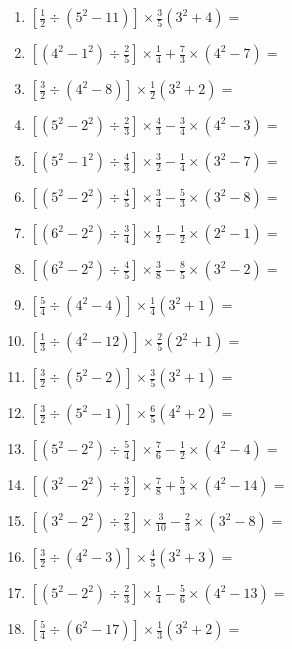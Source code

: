 \documentclass[12pt]{article}
\begin{document}
\begin{enumerate}[ itemsep=1.5cm]
	\item $\displaystyle \left[ \frac{1}{2} \div \left( 5^2 - 11 \right) \right] \times \frac{3}{5} \left( 3^2 + 4 \right) =$
	\item $\displaystyle \left[ \left( 4^2 - 1^2 \right) \div \frac{2}{5} \right] \times \frac{1}{4} + \frac{7}{3} \times \left( 4^2 - 7 \right) =$
	\item $\displaystyle \left[ \frac{3}{2} \div \left( 4^2 - 8 \right) \right] \times \frac{1}{2} \left( 3^2 + 2 \right) =$
	\item $\displaystyle \left[ \left( 5^2 - 2^2 \right) \div \frac{2}{3} \right] \times \frac{4}{3} - \frac{3}{4} \times \left( 4^2 - 3 \right) =$
	\item $\displaystyle \left[ \left( 5^2 - 1^2 \right) \div \frac{4}{3} \right] \times \frac{3}{2} - \frac{1}{4} \times \left( 3^2 - 7 \right) =$
	\item $\displaystyle \left[ \left( 5^2 - 2^2 \right) \div \frac{4}{5} \right] \times \frac{3}{4} - \frac{5}{3} \times \left( 3^2 - 8 \right) =$
	\item $\displaystyle \left[ \left( 6^2 - 2^2 \right) \div \frac{3}{4} \right] \times \frac{1}{2} - \frac{1}{2} \times \left( 2^2 - 1 \right) =$
	\item $\displaystyle \left[ \left( 6^2 - 2^2 \right) \div \frac{4}{5} \right] \times \frac{3}{8} - \frac{8}{5} \times \left( 3^2 - 2 \right) =$
	\item $\displaystyle \left[ \frac{5}{4} \div \left( 4^2 - 4 \right) \right] \times \frac{1}{4} \left( 3^2 + 1 \right) =$

	\item $\displaystyle \left[ \frac{1}{3} \div \left( 4^2 - 12 \right) \right] \times \frac{2}{5} \left( 2^2 + 1 \right) =$
	\item $\displaystyle \left[ \frac{3}{2} \div \left( 5^2 - 2 \right) \right] \times \frac{3}{5} \left( 3^2 + 1 \right) =$
	\item $\displaystyle \left[ \frac{3}{2} \div \left( 5^2 - 1 \right) \right] \times \frac{6}{5} \left( 4^2 + 2 \right) =$
	\item $\displaystyle \left[ \left( 5^2 - 2^2 \right) \div \frac{5}{4} \right] \times \frac{7}{6} - \frac{1}{2} \times \left( 4^2 - 4 \right) =$
	\item $\displaystyle \left[ \left( 3^2 - 2^2 \right) \div \frac{3}{2} \right] \times \frac{7}{8} + \frac{5}{3} \times \left( 4^2 - 14 \right) =$
	\item $\displaystyle \left[ \left( 3^2 - 2^2 \right) \div \frac{2}{3} \right] \times \frac{3}{10} - \frac{2}{3} \times \left( 3^2 - 8 \right) =$
	\item $\displaystyle \left[ \frac{3}{2} \div \left( 4^2 - 3 \right) \right] \times \frac{4}{5} \left( 3^2 + 3 \right) =$
	\item $\displaystyle \left[ \left( 5^2 - 2^2 \right) \div \frac{2}{3} \right] \times \frac{1}{4} - \frac{5}{6} \times \left( 4^2 - 13 \right) =$
	\item $\displaystyle \left[ \frac{5}{4} \div \left( 6^2 - 17 \right) \right] \times \frac{1}{3} \left( 3^2 + 2 \right) =$


\end{enumerate}
\end{document}

